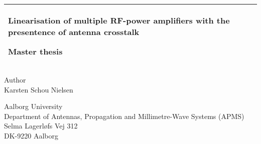 %
%
%
%
%
\begin{titlepage}
  \addtolength{\hoffset}{0.5\evensidemargin-0.5\oddsidemargin} %
  \noindent%
  \begin{tabular}{@{}p{\textwidth}@{}}
    \toprule[2pt]
    \midrule
    \vspace{0.2cm}
    \begin{center}
    \Huge{\textbf{
      Linearisation of multiple RF-power amplifiers with the presentence of antenna crosstalk %
    }}
    \end{center}
    \begin{center}
      \Large{
         Master thesis %
      }
    \end{center}
    \vspace{0.2cm}\\
    \midrule
    \toprule[2pt]
  \end{tabular}
  \vspace{4 cm}
  \begin{center}
    {\large
      Author%
    }\\
    \vspace{0.2cm}
    {\Large
      Karsten Schou Nielsen%
    }
  \end{center}
  \vfill
  \begin{center}
  Aalborg University\\
  Department of Antennas, Propagation and Millimetre-Wave Systems (APMS)\\
  Selma Lagerløfs Vej 312\\
  DK-9220 Aalborg
  \end{center}
\end{titlepage}
\clearpage
